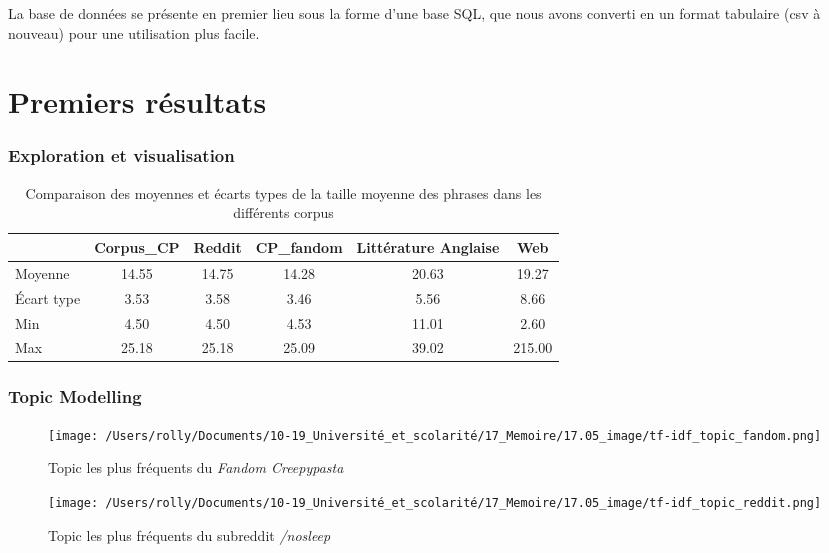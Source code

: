 \documentclass[12pt,a4paper,oneside,titlepage]{article} %
\begin{document}
	La base de données se présente en premier lieu sous la forme d'une base SQL, que nous avons converti en un format tabulaire (csv à nouveau) pour une utilisation plus facile. 

		
	\section*{Premiers résultats}
	
	\subsubsection*{Exploration et visualisation}
	
	\begin{table}[h]
		\centering
		\caption{Comparaison des moyennes et écarts types de la taille moyenne des phrases dans les différents corpus}
		\label{tab:corpus_comparison}
		\begin{tabular}{|l|c|c|c|c|c|}
			\hline
			& Corpus\_CP & Reddit & CP\_fandom & Littérature Anglaise & Web\\ \hline
			Moyenne & 14.55 & 14.75 & 14.28 & 20.63 & 19.27 \\ \hline
			Écart type & 3.53 & 3.58 & 3.46 & 5.56 & 8.66 \\ \hline
			Min & 4.50 & 4.50 & 4.53 & 11.01 & 2.60 \\ \hline
			Max & 25.18 & 25.18 & 25.09 & 39.02 & 215.00 \\ \hline
		\end{tabular}
	\end{table}
	
	
	
	\subsubsection*{Topic Modelling}
	
		\begin{figure}
			\centering
			\begin{minipage}[b]{0.45\textwidth}
				\texttt{[image: /Users/rolly/Documents/10-19\_Université\_et\_scolarité/17\_Memoire/17.05\_image/tf-idf\_topic\_fandom.png]}
				\caption{Topic les plus fréquents du \emph{Fandom Creepypasta}}
				\label{fig:image1}
			\end{minipage}
			\hfill
			\begin{minipage}[b]{0.45\textwidth}
				\texttt{[image: /Users/rolly/Documents/10-19\_Université\_et\_scolarité/17\_Memoire/17.05\_image/tf-idf\_topic\_reddit.png]}
				\caption{Topic les plus fréquents du subreddit \emph{/nosleep}}
				\label{fig:image2}
			\end{minipage}
		\end{figure}
		
\end{document}
